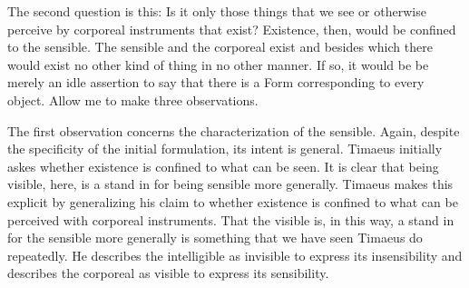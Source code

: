 
The second question is this: Is it only those things that we see or otherwise perceive by corporeal instruments that exist? Existence, then, would be confined to the sensible. The sensible and the corporeal exist and besides which there would exist no other kind of thing in no other manner. If so, it would be be merely an idle assertion to say that there is a Form corresponding to every object. Allow me to make three observations.

The first observation concerns the characterization of the sensible. Again, despite the specificity of the initial formulation, its intent is general. Timaeus initially askes whether existence is confined to what can be seen. It is clear that being visible, here, is a stand in for being sensible more generally. Timaeus makes this explicit by generalizing his claim to whether existence is confined to what can be perceived with corporeal instruments. That the visible is, in this way, a stand in for the sensible more generally is something that we have seen Timaeus do repeatedly. He describes the intelligible as invisible to express its insensibility and describes the corporeal as visible to express its sensibility. 

